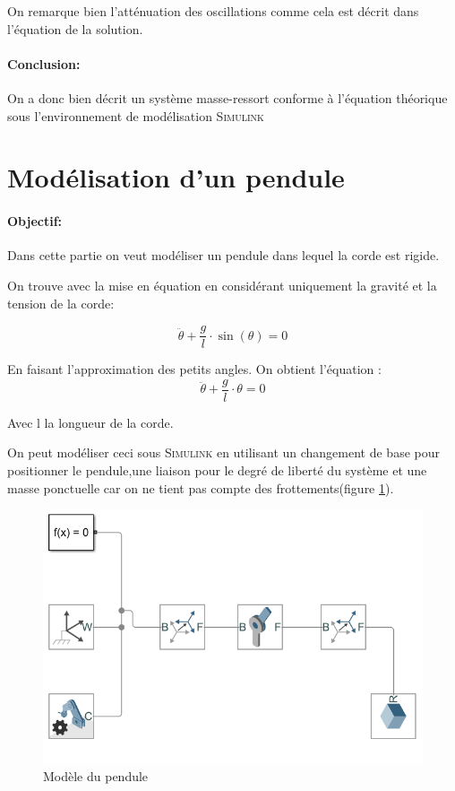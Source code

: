 \documentclass[12pt,a4paper]{article}
\begin{document}
On remarque bien l'atténuation des oscillations comme cela est décrit dans l'équation de la solution.
\newline
\paragraph*{Conclusion:}
On a donc bien décrit un système masse-ressort conforme à l'équation théorique sous l'environnement de modélisation \textsc{Simulink}

\section{Modélisation d'un pendule}
\paragraph*{Objectif:} Dans cette partie on veut modéliser un pendule dans lequel la corde est rigide. 

On trouve avec la mise en équation en considérant uniquement la gravité et la tension de la corde: 

\[ \ddot{\theta} + \dfrac{g}{l} \cdot \sin(\theta) = 0 \]

En faisant l'approximation des petits angles. On obtient l'équation :
\[ \ddot{\theta} + \dfrac{g}{l} \cdot \theta = 0 \]

Avec l la longueur de la corde.

On peut modéliser ceci sous \textsc{Simulink} en utilisant un changement de base pour positionner le pendule,une liaison pour le degré de liberté du système et une masse ponctuelle car on ne tient pas compte des frottements(figure \ref{pendule}).

\begin{figure}[h!]
\centering
\includegraphics[scale=0.6]{pendule.png}
\caption{Modèle du pendule}
\label{pendule}
\end{figure}
\end{document}
